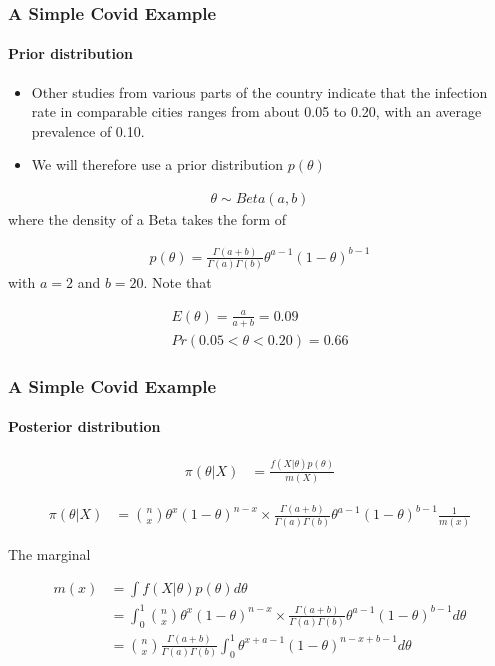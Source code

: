\documentclass[
  shownotes,
  xcolor={svgnames},
  hyperref={colorlinks,citecolor=DarkBlue,linkcolor=DarkRed,urlcolor=DarkBlue}
  ]{beamer}
\begin{document}
\begin{frame}[fragile]
\frametitle{A Simple Covid Example}
\framesubtitle{Prior distribution}

\begin{itemize}
\item Other studies from various parts of the country indicate that the infection rate in comparable cities ranges from about 0.05 to 0.20, with an average prevalence of 0.10.
\item We will therefore use a prior distribution $p(\theta)$ 
\end{itemize}


\begin{align}
\theta \sim Beta(a,b)
\end{align}
where the density of a Beta takes the form of

\begin{align}
p(\theta)=\frac{\Gamma\left(a+b\right)}{\Gamma\left(a\right)\Gamma\left(b\right)}\theta^{a-1}\left(1-\theta\right)^{b-1}
\end{align}
with $a=2$ and $b=20$. Note that 

\begin{align}
E(\theta) =\frac{a}{a+b} =0.09 \\
Pr(0.05 < \theta < 0.20) = 0.66
\end{align}

\end{frame}
\begin{frame}[fragile]
\frametitle{A Simple Covid Example}
\framesubtitle{Posterior distribution}

\begin{align}
\pi(\theta|X) &= \frac{f(X|\theta)p(\theta)}{m(X)} 
\end{align}


\begin{align}
\pi(\theta|X) &=  \binom{n}{x}\theta^x(1-\theta)^{n-x} \times\frac{\Gamma(a+b)}{\Gamma(a)\Gamma(b)}\theta^{a-1}(1-\theta)^{b-1}  \frac{1}{m(x)}
\end{align}

The marginal

\begin{align}
m(x) &= \int f(X|\theta)p(\theta)d\theta \\
 &= \int_0^1 \binom{n}{x}\theta^x(1-\theta)^{n-x} \times\frac{\Gamma(a+b)}{\Gamma(a)\Gamma(b)}\theta^{a-1}(1-\theta)^{b-1}  d\theta \\
 &= \binom{n}{x} \frac{\Gamma(a+b)}{\Gamma(a)\Gamma(b)} \int_0^1 \theta^{x+a-1}(1-\theta)^{n-x+b-1}  d\theta 
\end{align}

\end{frame}
\end{document}
